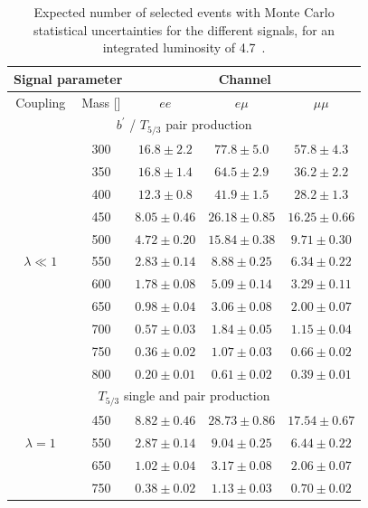 \begin{table}[p]
\begin{center}
    \vspace{5mm}
 
    \caption{Expected number of selected events with Monte Carlo statistical uncertainties 
	for the different signals, for an integrated luminosity of 4.7~\ifb{}.}\label{yieldsignal}
    \begin{tabular}{c|c|c|c|c}
      \hline\hline
      \multicolumn{2}{c|}{Signal parameter}  & \multicolumn{3}{c}{Channel} \\
      \hline
      Coupling& Mass [\GeV{}]      & $ee$ & $e\mu$ & $\mu\mu$ \\ 
      \hline
       \multicolumn{5}{c}{$b^\prime$ / $T_{5/3}$ pair production} \\
      \hline
      & 300 & $16.8 \pm 2.2$   & $77.8 \pm 5.0$   & $57.8 \pm 4.3$     \\ 
      & 350 & $16.8 \pm 1.4$   & $64.5 \pm 2.9$   & $36.2 \pm 2.2$     \\ 
      & 400 & $12.3 \pm 0.8$   & $41.9 \pm 1.5$   & $28.2 \pm 1.3$     \\ 
      & 450 & $8.05 \pm 0.46$   & $26.18 \pm 0.85$   & $16.25 \pm 0.66$     \\ 
      & 500 & $4.72 \pm 0.20$   & $15.84 \pm 0.38$   & $9.71 \pm 0.30$     \\ 
      $\lambda\ll1$ & 550 & $2.83 \pm 0.14$   & $8.88 \pm 0.25$   & $6.34 \pm 0.22$     \\ 
      & 600 & $1.78 \pm 0.08$   & $5.09 \pm 0.14$   & $3.29 \pm 0.11$     \\ 
      & 650 & $0.98 \pm 0.04$   & $3.06 \pm 0.08$   & $2.00 \pm 0.07$     \\ 
      & 700 & $0.57 \pm 0.03$   & $1.84 \pm 0.05$   & $1.15 \pm 0.04$     \\ 
      & 750 & $0.36 \pm 0.02$   & $1.07 \pm 0.03$   & $0.66 \pm 0.02$     \\ 
      & 800 & $0.20 \pm 0.01$   & $0.61 \pm 0.02$   & $0.39 \pm 0.01$     \\ 
      \hline
      \multicolumn{5}{c}{$T_{5/3}$ single and pair production} \\
      \hline
      & 450 & $8.82 \pm 0.46$ & $28.73 \pm 0.86$ & $17.54 \pm 0.67$ \\
      $\lambda=1$ & 550 & $2.87 \pm 0.14$ & $9.04  \pm 0.25$ & $6.44  \pm 0.22$ \\
      & 650 & $1.02 \pm 0.04$ & $3.17  \pm 0.08$ & $2.06  \pm 0.07$ \\
      & 750 & $0.38 \pm 0.02$ & $1.13  \pm 0.03$ & $0.70  \pm 0.02$ \\

\end{tabular}
\end{center}
\end{table}
